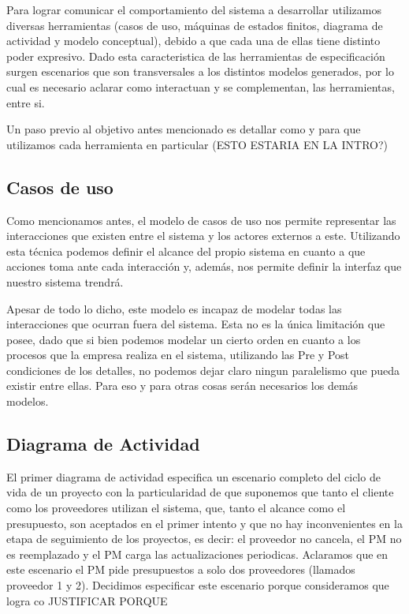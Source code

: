 Para lograr comunicar el comportamiento del sistema a desarrollar utilizamos diversas herramientas (casos de uso, máquinas de estados finitos, diagrama de actividad y modelo conceptual), debido a que cada una de ellas tiene distinto poder expresivo.
Dado esta caracteristica de las herramientas de especificación surgen escenarios que son transversales a los distintos modelos generados, por lo cual es necesario aclarar como interactuan y se complementan, las herramientas, entre si.

Un paso previo al objetivo antes mencionado es detallar como y para que utilizamos cada herramienta en particular (ESTO ESTARIA EN LA INTRO?)
\subsection{Casos de uso}
Como mencionamos antes, el modelo de casos de uso nos permite representar las interacciones que existen entre
el sistema y los actores externos a este. Utilizando esta técnica podemos definir el alcance del propio sistema
en cuanto a que acciones toma ante cada interacción y, además, nos permite definir la interfaz que nuestro
sistema trendrá.

Apesar de todo lo dicho, este modelo es incapaz de modelar todas las interacciones que ocurran fuera del sistema.
Esta no es la única limitación que posee, dado que si bien podemos modelar un cierto orden en cuanto a los procesos
que la empresa realiza en el sistema, utilizando las Pre y Post condiciones de los detalles, no podemos dejar
claro ningun paralelismo que pueda existir entre ellas. Para eso y para otras cosas serán necesarios los demás modelos.

\subsection{Diagrama de Actividad}
El primer diagrama de actividad especifica un escenario completo del ciclo de vida de un proyecto con la particularidad de que suponemos que tanto el cliente como los proveedores utilizan el sistema, que, tanto el alcance como el presupuesto, son aceptados en el primer intento y que no hay inconvenientes en la etapa de seguimiento de los proyectos, es decir: el proveedor no cancela, el PM no es reemplazado y el PM carga las actualizaciones periodicas. Aclaramos que en este escenario el PM pide presupuestos a solo dos proveedores (llamados proveedor 1 y 2). Decidimos especificar este escenario porque consideramos que logra co
JUSTIFICAR PORQUE

